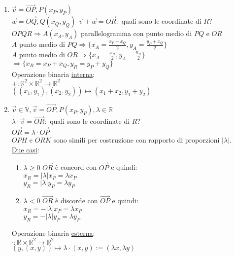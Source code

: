 \documentclass{article}
\newcommand{\ul}[1]{\underline{#1}}
\newcommand{\R}{\mathbb{R}}
\newcommand{\V}{\mathbb{V}}
\begin{document}
\begin{enumerate}
	\item $\overrightarrow{v}=\overrightarrow{OP},P(x_P,y_P)$\\
	      $\overrightarrow{w}=\overrightarrow{OQ},Q(x_Q,y_Q)$
	      $\overrightarrow{v}+\overrightarrow{w}=\overrightarrow{OR}:$ quali sono le coordinate di $R$?\\
	      $OPQR\Rightarrow A(x_A,y_A)$ parallelogramma con punto medio di $PQ$ e $OR$\\
	      $A$ punto medio di $PQ\Rightarrow\{x_A=\frac{x_P+x_Q}{2},y_A=\frac{y_P+x_Q}{2}\}$\\
	      $A$ punto medio di $OR\Rightarrow\{x_A=\frac{x_R}{2},y_A=\frac{y_R}{2}\}$\\
	      $\Rightarrow\{x_R=x_P+x_Q,y_R=y_P+y_Q\}$\\
	      Operazione binaria \ul{interna}:\\
	      $+:\R^2\times\R^2\rightarrow\R^2$\\
	      $((x_1,y_1),(x_2,y_2))\mapsto(x_1+x_2,y_1+y_2)$
	\item $\overrightarrow{v}\in\V,\overrightarrow{v}=\overrightarrow{OP},P(x_P,y_P),\lambda\in\R$\\
	      $\lambda\cdot\overrightarrow{v}=\overrightarrow{OR}:$ quali sono le coordinate di $R$?\\
	      $\overrightarrow{OR}=\lambda\cdot\overrightarrow{OP}$\\
	      $OPH$ e $ORK$ sono simili per costruzione con rapporto di proporzioni $|\lambda|$.\\
	      \ul{Due casi}:
	      \begin{enumerate}
		      \item $\lambda\ge0$ $\overrightarrow{OR}$ è concord con $\overrightarrow{OP}$ e quindi:\\
		            $x_R=|\lambda|x_P=\lambda x_P$\\
		            $y_R=|\lambda|y_P=\lambda y_P$
		      \item $\lambda<0$ $\overrightarrow{OR}$ è discorde con $\overrightarrow{OP}$ e quindi:\\
		            $x_R=-|\lambda|x_P=\lambda x_P$\\
		            $y_R=-|\lambda|y_P=\lambda y_P$
	      \end{enumerate}
	      Operazione binaria \ul{esterna}:\\
	      $\cdot:\R\times\R^2\rightarrow\R^2$\\
	      \hspace*{0.1em}$(y,(x,y))\mapsto\lambda\cdot(x,y):=(\lambda x,\lambda y)$
\end{enumerate}
\end{document}
